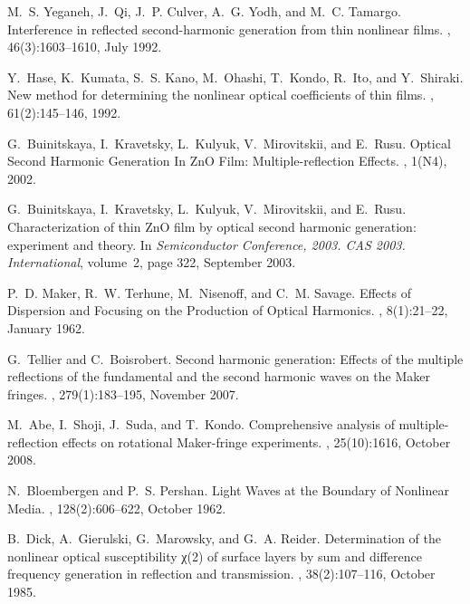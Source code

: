 \documentclass[aps,prb,10pt,showpacs,letterpaper,twocolumn]{revtex4-1}
\begin{document}
\begin{thebibliography}{10}
M.~S. Yeganeh, J.~Qi, J.~P. Culver, A.~G. Yodh, and M.~C. Tamargo.
\newblock Interference in reflected second-harmonic generation from thin
  nonlinear films.
, 46(3):1603--1610, July 1992.

Y.~Hase, K.~Kumata, S.~S. Kano, M.~Ohashi, T.~Kondo, R.~Ito, and Y.~Shiraki.
\newblock New method for determining the nonlinear optical coefficients of thin
  films.
, 61(2):145--146, 1992.

G.~Buinitskaya, I.~Kravetsky, L.~Kulyuk, V.~Mirovitskii, and E.~Rusu.
\newblock Optical {Second} {Harmonic} {Generation} {In} {ZnO} {Film}:
  {Multiple}-reflection {Effects}.
, 1(N4), 2002.

G.~Buinitskaya, I.~Kravetsky, L.~Kulyuk, V.~Mirovitskii, and E.~Rusu.
\newblock Characterization of thin {ZnO} film by optical second harmonic
  generation: experiment and theory.
\newblock In {\em Semiconductor Conference, 2003. CAS 2003. International},
  volume~2, page 322, September 2003.

P.~D. Maker, R.~W. Terhune, M.~Nisenoff, and C.~M. Savage.
\newblock Effects of {Dispersion} and {Focusing} on the {Production} of
  {Optical} {Harmonics}.
, 8(1):21--22, January 1962.

G.~Tellier and C.~Boisrobert.
\newblock Second harmonic generation: {Effects} of the multiple reflections of
  the fundamental and the second harmonic waves on the {Maker} fringes.
, 279(1):183--195, November 2007.

M.~Abe, I.~Shoji, J.~Suda, and T.~Kondo.
\newblock Comprehensive analysis of multiple-reflection effects on rotational
  {Maker}-fringe experiments.
, 25(10):1616, October 2008.

N.~Bloembergen and P.~S. Pershan.
\newblock Light {Waves} at the {Boundary} of {Nonlinear} {Media}.
, 128(2):606--622, October 1962.

B.~Dick, A.~Gierulski, G.~Marowsky, and G.~A. Reider.
\newblock Determination of the nonlinear optical susceptibility χ(2) of
  surface layers by sum and difference frequency generation in reflection and
  transmission.
, 38(2):107--116, October 1985.


\end{thebibliography}
\end{document}
